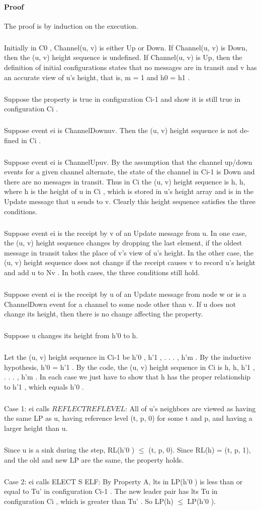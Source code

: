 \paragraph{Proof}The proof is by induction on the execution.
\subparagraph{}Initially in C0 , Channel(u, v) is either Up or Down. If Channel(u, v) is Down, then the (u, v) height sequence is undefined. If Channel(u, v) is Up, then the definition of initial configurations states that no messages are in transit and v has an accurate view of u's height, that is, m = 1 and h0 = h1 .
\subparagraph{}Suppose the property is true in configuration Ci-1 and show it is still true in configuration Ci .
\subparagraph{}Suppose event ei is ChannelDownuv. Then the (u, v) height sequence is not de- fined in Ci .
\subparagraph{}Suppose event ei is ChannelUpuv. By the assumption that the channel up/down events for a given channel alternate, the state of the channel in Ci-1 is Down and there are no messages in transit. Thus in Ci the (u, v) height sequence is h, h, where h is the height of u in Ci , which is stored in u's height array and is in the Update message that u sends to v. Clearly this height sequence satisfies the three conditions.
\subparagraph{}Suppose event ei is the receipt by v of an Update message from u. In one case, the (u, v) height sequence changes by dropping the last element, if the oldest message in transit takes the place of v's view of u's height. In the other case, the (u, v) height sequence does not change if the receipt causes v to record u's height and add u to Nv . In both cases, the three conditions still hold.
\subparagraph{}Suppose event ei is the receipt by u of an Update message from node w or is a ChannelDown event for a channel to some node other than v. If u does not change its height, then there is no change affecting the property.
\subparagraph{}Suppose u changes its height from h'0 to h.
\subparagraph{}Let the (u, v) height sequence in Ci-1 be h'0 , h'1 , . . . , h'm . By the inductive hypothesis, h'0 = h'1 . By the code, the (u, v) height sequence in Ci is h, h, h'1 , . . . , h'm . In each case we just have to show that h has the proper relationship to h'1 , which equals h'0 .
\subparagraph{}Case 1: ei calls $REFLECTREFLEVEL$: All of u's neighbors are viewed as having the same LP as u, having reference level (t, p, 0) for some t and p, and having a larger height than u.
\subparagraph{}Since u is a sink during the step, RL(h'0 ) $\leq$ (t, p, 0). Since RL(h) = (t, p, 1), and the old and new LP are the same, the property holds.
\subparagraph{}Case 2: ei calls ELECT S ELF: By Property A, lts in LP(h'0 ) is less than or equal to Tu' in configuration Ci-1 . The new leader pair has lts Tu in configuration Ci , which is greater than Tu' . So LP(h) $\leq$ LP(h'0 ).
